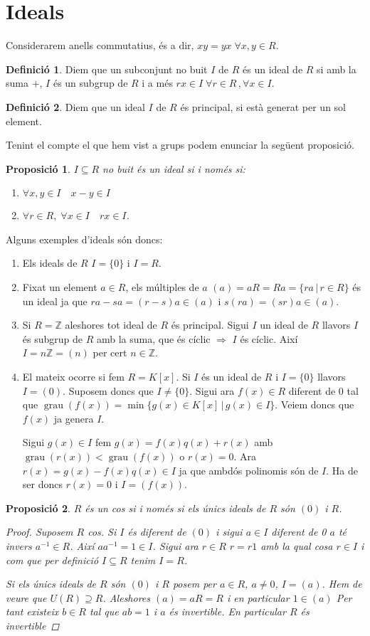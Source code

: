 \documentclass[a4paper,11pt]{report}
\newcommand{\inv}[1]{#1^{-1}}
\newcommand{\barra}{\,|\,}
\DeclareMathOperator{\grau}{grau}
\theoremstyle{theorem}
\newtheorem{proposicio}{\normalfont \sffamily\bfseries Proposició}[section]
\theoremstyle{definition}
\newtheorem{definicio}{\normalfont\sffamily\bfseries Definició}[section]
\begin{document}
\section{Ideals}
Considerarem anells commutatius, és a dir, $xy=yx\;\forall x,y\in R$. 
\begin{definicio}
	Diem que un subconjunt no buit $I$ de $R$ és un ideal de $R$ si amb la suma $+$, $I$ és un subgrup de $R$ i a més $rx\in I\;\forall r\in R\, ,\forall x\in I$.
\end{definicio}
\begin{definicio} Diem que un ideal $I$ de $R$ és principal, si està generat per un sol element.
\end{definicio}
Tenint el compte el que hem vist a grups podem enunciar la següent proposició.
\begin{proposicio}
	$I\subseteq R$ no buit és un ideal si i només si:\begin{enumerate}
		\item $\forall x,y\in I\quad x-y\in I$
		\item $\forall r\in R,\;\forall x\in I\quad rx\in I$. 
	\end{enumerate}
\end{proposicio}
Alguns exemples d'ideals són doncs:
\begin{enumerate}
	\item Els ideals de $R$ $I=\{0\}$ i $I=R$.
	\item Fixat un element $a\in R$, els múltiples de $a$ $(a)=aR=Ra=\{ra\barra r\in R\}$ és un ideal ja que $ra-sa=(r-s)a\in (a)$ i $s(ra)=(sr)a\in (a)$.
	\item Si $R=\mathbb{Z}$ aleshores tot ideal de $R$ és principal. Sigui $I$ un ideal de $R$ llavors $I$ és subgrup de $R$ amb la suma, que és cíclic $\Rightarrow$ $I$ és cíclic. Així $I=n\mathbb{Z}=(n)$ per cert $n\in \mathbb{Z}$.
	\item El mateix ocorre si fem $R=K[x]$. Si $I$ és un ideal de $R$ i $I=\{0\}$ llavors $I=(0)$. Suposem doncs que $I\neq\{0\}$. Sigui ara $f(x)\in R$ diferent de $0$ tal que $\grau(f(x))=\min\{g(x)\in K[x]\barra g(x)\in I\}$. Veiem doncs que $f(x)$ ja genera $I$.
	
	Sigui $g(x)\in I$ fem $g(x)=f(x)q(x)+r(x)$ amb $\grau(r(x))<\grau(f(x))$ o $r(x)=0$. Ara $r(x)=g(x)-f(x)q(x)\in I$ ja que ambdós polinomis són de $I$. Ha de ser doncs $r(x)=0$ i $I=(f(x))$.
\end{enumerate}
\begin{proposicio}
	$R$ és un cos si i només si els únics ideals de $R$ són $(0)$ i $R$.
	\begin{proof}
		Suposem $R$ cos. Si $I$  és diferent de $(0)$ i sigui $a\in I$ diferent de 0 $a$ té invers $\inv{a}\in R$. Així $a\inv{a}=1\in I$. Sigui ara $r\in R$ $r=r1$ amb la qual cosa $r\in I$ i com que per definició $I\subseteq R$ tenim $I=R$.
		
		Si els únics ideals de $R$ són $(0)$ i $R$ posem per $a\in R$, $a\neq 0$, $I=(a)$. Hem de veure que $U(R)\supseteq R$. Aleshores $(a)=aR=R$ i en particular $1\in (a)$ Per tant existeix $b\in R$ tal que $ab=1$ i $a$ és invertible. En particular $R$ és invertible
	\end{proof}
\end{proposicio}
\end{document}
